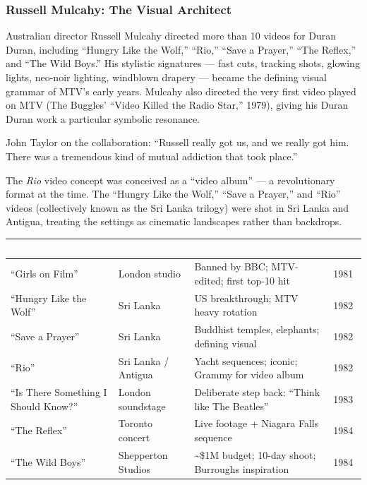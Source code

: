 \documentclass[11pt,letterpaper]{article}
\newcommand{\tableheader}[1]{\textbf{\sffamily\textcolor{white}{#1}}}
\begin{document}
\subsubsection{Russell Mulcahy: The Visual Architect}

Australian director Russell Mulcahy directed more than 10 videos for Duran Duran, including ``Hungry Like the Wolf,'' ``Rio,'' ``Save a Prayer,'' ``The Reflex,'' and ``The Wild Boys.'' His stylistic signatures --- fast cuts, tracking shots, glowing lights, neo-noir lighting, windblown drapery --- became the defining visual grammar of MTV's early years. Mulcahy also directed the very first video played on MTV (The Buggles' ``Video Killed the Radio Star,'' 1979), giving his Duran Duran work a particular symbolic resonance.

John Taylor on the collaboration: ``Russell really got us, and we really got him. There was a tremendous kind of mutual addiction that took place.''

The \textit{Rio} video concept was conceived as a ``video album'' --- a revolutionary format at the time. The ``Hungry Like the Wolf,'' ``Save a Prayer,'' and ``Rio'' videos (collectively known as the Sri Lanka trilogy) were shot in Sri Lanka and Antigua, treating the settings as cinematic landscapes rather than backdrops.

\begin{center}
\begin{tabularx}{\textwidth}{L{3.5cm}L{3cm}XL{2cm}}
\toprule
{}
\tableheader{Video} & \tableheader{Location} & \tableheader{Significance} & \tableheader{Year} \\
\midrule
``Girls on Film'' & London studio & Banned by BBC; MTV-edited; first top-10 hit & 1981 \\
``Hungry Like the Wolf'' & Sri Lanka & US breakthrough; MTV heavy rotation & 1982 \\
``Save a Prayer'' & Sri Lanka & Buddhist temples, elephants; defining visual & 1982 \\
``Rio'' & Sri Lanka / Antigua & Yacht sequences; iconic; Grammy for video album & 1982 \\
``Is There Something I Should Know?'' & London soundstage & Deliberate step back: ``Think like The Beatles'' & 1983 \\
``The Reflex'' & Toronto concert & Live footage + Niagara Falls sequence & 1984 \\
``The Wild Boys'' & Shepperton Studios & \textasciitilde\$1M budget; 10-day shoot; Burroughs inspiration & 1984 \\
\bottomrule
\end{tabularx}
\end{center}
\end{document}
